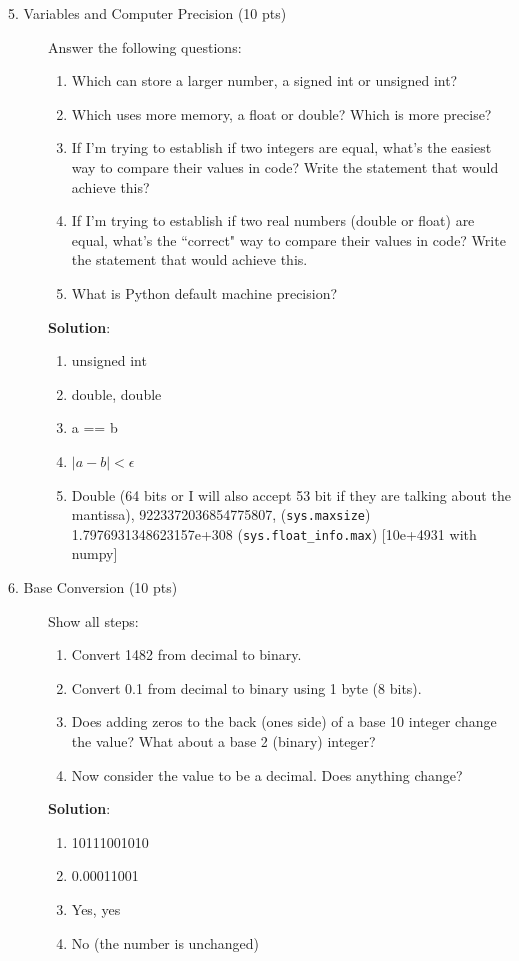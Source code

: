\documentclass[12pt]{article}
\begin{document}
\begin{description}
\item[5. Variables and Computer Precision (10 pts)]  Answer the following questions:
	\begin{enumerate}[label=\textbf{(\alph*)}]
		\item Which can store a larger number, a signed int or unsigned int?
		\item Which uses more memory, a float or double? Which is more precise?
		\item If I'm trying to establish if two integers are equal, what's the easiest way to compare their values in code? Write the statement that would achieve this?
		\item If I'm trying to establish if two real numbers (double or float) are equal, what's the ``correct" way to compare their values in code? Write the statement that would achieve this.
		\item What is Python default machine precision?
	\end{enumerate}
	
	\color{red}
	\ifsolution
	{\bf Solution}:
    \begin{enumerate}[label=\textbf{(\alph*)}]
		\item unsigned int
		\item double, double
		\item a == b
		\item $|a - b| < \epsilon$
		\item Double (64 bits or I will also accept 53 bit if they are talking about the mantissa), 9223372036854775807, (\verb"sys.maxsize") 1.7976931348623157e+308 (\verb"sys.float_info.max") [10e+4931 with numpy]
	\end{enumerate}
	\fi
	\color{black}

\item[6. Base Conversion (10 pts)] Show all steps:
\begin{enumerate}[label=\textbf{(\alph*)}]
		\item Convert 1482 from decimal to binary.
		\item Convert 0.1 from decimal to binary using 1 byte (8 bits).
		\item Does adding zeros to the back (ones side) of a base 10 integer change the value? What about a base 2 (binary) integer?
		\item Now consider the value to be a decimal. Does anything change?
	\end{enumerate}
	
	\color{red}
	\ifsolution
	{\bf Solution}:
    \begin{enumerate}[label=\textbf{(\alph*)}]
		\item 10111001010
		\item 0.00011001
		\item Yes, yes
		\item No (the number is unchanged)
	\end{enumerate}
	\fi
	\color{black}


\end{description}
\end{document}
